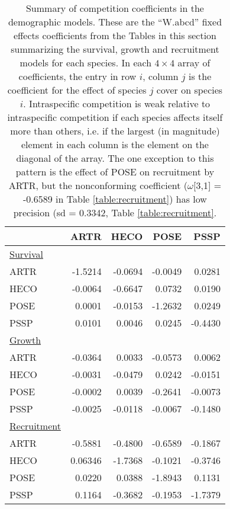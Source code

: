 \documentclass[11pt]{article}
\begin{document}
\newpage 
\begin{table}[ht]
\centering
\caption{Summary of competition coefficients in the demographic models. These are the ``W.abcd'' fixed effects coefficients from
the Tables in this section summarizing the survival, growth and recruitment models for each species.  
In each $4 \times 4$ array of coefficients, the entry in row $i$, column $j$ is the 
coefficient for the effect of species $j$ cover on species $i$. Intraspecific competition is weak relative to intraspecific competition if each
species affects itself more than others, i.e. if the largest (in magnitude) element in each column is the element on the diagonal of the array.
The one exception to this pattern is the effect of POSE on recruitment by ARTR, but the nonconforming
coefficient ($\omega$[3,1] = -0.6589 in Table \ref{table:recruitment}) has low precision (sd = 0.3342, Table \ref{table:recruitment}.} 
\label{table:alphas}
\begin{tabular}{lrrrr}
       & ARTR &  HECO &  POSE &  PSSP \\
\hline 
\underline{Survival} & & & & \\        
ARTR   & -1.5214  & -0.0694  & -0.0049 &  0.0281\\
HECO   & -0.0064  &  -0.6647 &  0.0732 &  0.0190\\
POSE  &   0.0001&  -0.0153 &  -1.2632&   0.0249\\
PSSP  &  0.0101 &  0.0046 & 0.0245 &  -0.4430\\
\underline{Growth} & & & & \\ 
ARTR   & -0.0364 &  0.0033& -0.0573&  0.0062\\
HECO   &  -0.0031 & -0.0479& 0.0242 & -0.0151\\
POSE  &  -0.0002& 0.0039&  -0.2641&   -0.0073\\
PSSP  & -0.0025 & -0.0118 & -0.0067 & -0.1480\\
\underline{Recruitment} & & & & \\ 
ARTR  & -0.5881 &  -0.4800 & -0.6589 & -0.1867\\
HECO   &   0.06346 & -1.7368 & -0.1021 & -0.3746\\
POSE  &   0.0220 &  0.0388 & -1.8943 &  0.1131\\
PSSP  &  0.1164 & -0.3682 & -0.1953 & -1.7379\\
\hline
\end{tabular}
\end{table}

\clearpage

\renewcommand{\theequation}{C-\arabic{equation}}
\renewcommand{\thetable}{C-\arabic{table}}
\renewcommand{\thefigure}{C-\arabic{figure}}
\end{document}
